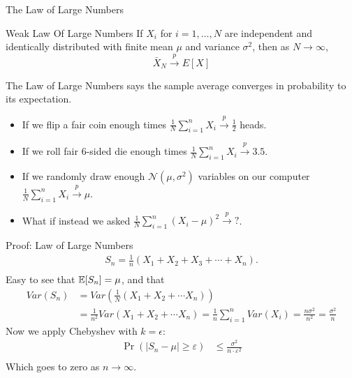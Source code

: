 \begin{frame}{The Law of Large Numbers}
\begin{center}
\begin{minipage}{.8\textwidth}
	\begin{block}{Weak Law Of Large Numbers}
		If $X_i$ for $i=1,\dots,N$ are \alert{independent and identically distributed} with finite mean $\mu$ and variance $\sigma^2$,
		then as $N\rightarrow \infty$,\[
			\bar{X}_N \overset{p}{\rightarrow} E\left[X\right]
		\]
	\end{block}
\end{minipage}
\end{center}
The Law of Large Numbers says the sample average converges in probability to its expectation.
\begin{itemize}
\item If we flip a fair coin enough times $\frac{1}{N}\sum_{i=1}^n X_i \overset{p}{\to} \frac{1}{2}$ heads.
\item If we roll fair 6-sided die enough times $\frac{1}{N}\sum_{i=1}^n X_i \overset{p}{\to} 3.5$.
\item If we randomly draw enough $\mathcal{N}(\mu,\sigma^2)$ variables on our computer $\frac{1}{N}\sum_{i=1}^n X_i \overset{p}{\to} \mu$.
\item What if instead we asked $\frac{1}{N}\sum_{i=1}^n (X_i -\mu)^2 \overset{p}{\to} ?$.
\end{itemize}
\end{frame}


\begin{frame}{Proof: Law of Large Numbers}
\begin{align*}
S_n = \frac{1}{n} (X_1 + X_2 + X_3 + \cdots + X_n).\\
\end{align*}
Easy to see that $\mathbb{E}[S_n] = \mu$, and that
\begin{align*}
Var (S_n) &= Var\left(\frac{1}{N}(X_1 + X_2 + \cdots X_n) \right) \\
&= \frac{1}{n^2} Var \left(X_1 + X_2 + \cdots X_n \right) = \frac{1}{n}\sum_{i=1}^n Var(X_i) = \frac{n \sigma^2}{n^2} = \frac{\sigma^2}{n} 
\end{align*}
Now we apply Chebyshev with $k=\epsilon$:
\begin{align*}
\Pr\left(|S_n - \mu| \geq \varepsilon\right) &\leq \frac{\sigma^2}{n \cdot \varepsilon^2}\\
\end{align*}
Which goes to zero as $n \rightarrow \infty$.

\end{frame}


